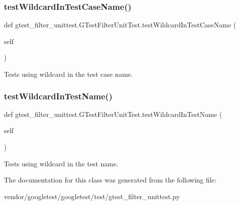 \subsubsection{\texorpdfstring{test\+Wildcard\+In\+Test\+Case\+Name()}{testWildcardInTestCaseName()}}
{\footnotesize\ttfamily def gtest\+\_\+filter\+\_\+unittest.\+G\+Test\+Filter\+Unit\+Test.\+test\+Wildcard\+In\+Test\+Case\+Name (\begin{DoxyParamCaption}\item[{}]{self }\end{DoxyParamCaption})}

\begin{DoxyVerb}Tests using wildcard in the test case name.\end{DoxyVerb}
 \mbox{\label{classgtest__filter__unittest_1_1_g_test_filter_unit_test_a9b1e6b35e158d7c6d11b8f4d2cb600cb}} 
\subsubsection{\texorpdfstring{test\+Wildcard\+In\+Test\+Name()}{testWildcardInTestName()}}
{\footnotesize\ttfamily def gtest\+\_\+filter\+\_\+unittest.\+G\+Test\+Filter\+Unit\+Test.\+test\+Wildcard\+In\+Test\+Name (\begin{DoxyParamCaption}\item[{}]{self }\end{DoxyParamCaption})}

\begin{DoxyVerb}Tests using wildcard in the test name.\end{DoxyVerb}
 

The documentation for this class was generated from the following file\+:\begin{DoxyCompactItemize}
\item 
vendor/googletest/googletest/test/gtest\+\_\+filter\+\_\+unittest.\+py\end{DoxyCompactItemize}
